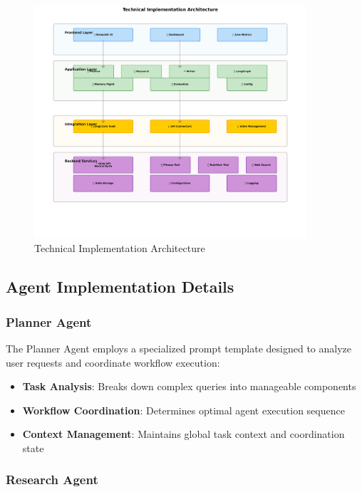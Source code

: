 \documentclass[conference]{IEEEtran}
\begin{document}
\begin{figure}[htbp]
\centering
\includegraphics[width=0.9\textwidth]{diagrams/technical_implementation.png}
\caption{Technical Implementation Architecture}
\label{fig:implementation_architecture}
\end{figure}

\subsection{Agent Implementation Details}

\subsubsection{Planner Agent}

The Planner Agent employs a specialized prompt template designed to analyze user requests and coordinate workflow execution:

\begin{itemize}
\item \textbf{Task Analysis}: Breaks down complex queries into manageable components
\item \textbf{Workflow Coordination}: Determines optimal agent execution sequence
\item \textbf{Context Management}: Maintains global task context and coordination state
\end{itemize}

\subsubsection{Research Agent}
\end{document}
